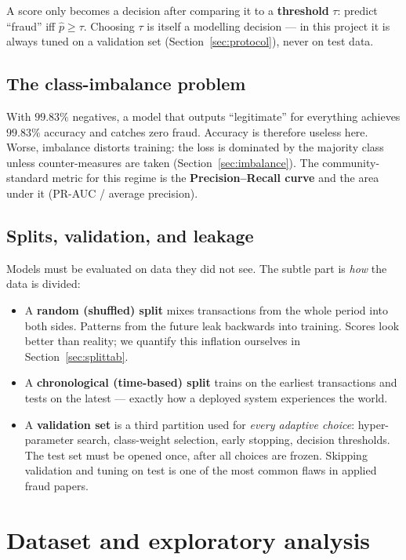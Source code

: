 \documentclass[11pt,a4paper]{article}
\newcommand{\term}[1]{\textbf{\textcolor{accent}{#1}}}
\begin{document}
A score only becomes a decision after comparing it to a \term{threshold} $\tau$:
predict ``fraud'' iff $\hat{p} \geq \tau$. Choosing $\tau$ is itself a modelling decision ---
in this project it is always tuned on a validation set (Section~\ref{sec:protocol}),
never on test data.

\subsection{The class-imbalance problem}
With $99.83\%$ negatives, a model that outputs ``legitimate'' for everything achieves
$99.83\%$ accuracy and catches zero fraud. Accuracy is therefore useless here. Worse,
imbalance distorts training: the loss is dominated by the majority class unless counter-measures
are taken (Section~\ref{sec:imbalance}). The community-standard metric for this regime is the
\term{Precision--Recall curve} and the area under it (PR-AUC / average precision).

\subsection{Splits, validation, and leakage}
Models must be evaluated on data they did not see. The subtle part is \emph{how} the data is
divided:

\begin{itemize}[leftmargin=*]
      \item A \term{random (shuffled) split} mixes transactions from the whole period into both
            sides. Patterns from the future leak backwards into training. Scores look better than
            reality; we quantify this inflation ourselves in Section~\ref{sec:splittab}.
      \item A \term{chronological (time-based) split} trains on the earliest transactions and tests
            on the latest --- exactly how a deployed system experiences the world.
      \item A \term{validation set} is a third partition used for \emph{every adaptive choice}:
            hyper-parameter search, class-weight selection, early stopping, decision thresholds.
            The test set must be opened once, after all choices are frozen. Skipping validation
            and tuning on test is one of the most common flaws in applied fraud papers.
\end{itemize}

\section{Dataset and exploratory analysis}
\end{document}
